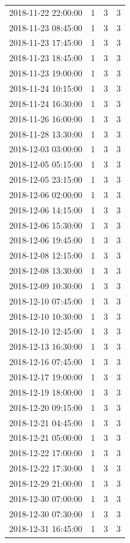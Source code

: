 \begin{tabular}{lrrr}
2018-11-22 22:00:00 & 1 & 3 & 3 \\
2018-11-23 08:45:00 & 1 & 3 & 3 \\
2018-11-23 17:45:00 & 1 & 3 & 3 \\
2018-11-23 18:45:00 & 1 & 3 & 3 \\
2018-11-23 19:00:00 & 1 & 3 & 3 \\
2018-11-24 10:15:00 & 1 & 3 & 3 \\
2018-11-24 16:30:00 & 1 & 3 & 3 \\
2018-11-26 16:00:00 & 1 & 3 & 3 \\
2018-11-28 13:30:00 & 1 & 3 & 3 \\
2018-12-03 03:00:00 & 1 & 3 & 3 \\
2018-12-05 05:15:00 & 1 & 3 & 3 \\
2018-12-05 23:15:00 & 1 & 3 & 3 \\
2018-12-06 02:00:00 & 1 & 3 & 3 \\
2018-12-06 14:15:00 & 1 & 3 & 3 \\
2018-12-06 15:30:00 & 1 & 3 & 3 \\
2018-12-06 19:45:00 & 1 & 3 & 3 \\
2018-12-08 12:15:00 & 1 & 3 & 3 \\
2018-12-08 13:30:00 & 1 & 3 & 3 \\
2018-12-09 10:30:00 & 1 & 3 & 3 \\
2018-12-10 07:45:00 & 1 & 3 & 3 \\
2018-12-10 10:30:00 & 1 & 3 & 3 \\
2018-12-10 12:45:00 & 1 & 3 & 3 \\
2018-12-13 16:30:00 & 1 & 3 & 3 \\
2018-12-16 07:45:00 & 1 & 3 & 3 \\
2018-12-17 19:00:00 & 1 & 3 & 3 \\
2018-12-19 18:00:00 & 1 & 3 & 3 \\
2018-12-20 09:15:00 & 1 & 3 & 3 \\
2018-12-21 04:45:00 & 1 & 3 & 3 \\
2018-12-21 05:00:00 & 1 & 3 & 3 \\
2018-12-22 17:00:00 & 1 & 3 & 3 \\
2018-12-22 17:30:00 & 1 & 3 & 3 \\
2018-12-29 21:00:00 & 1 & 3 & 3 \\
2018-12-30 07:00:00 & 1 & 3 & 3 \\
2018-12-30 07:30:00 & 1 & 3 & 3 \\
2018-12-31 16:45:00 & 1 & 3 & 3 \\

\end{tabular}
